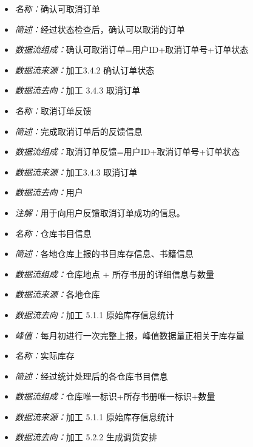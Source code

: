 \vspace{-1mm}

\begin{itemize}
\item \textit{名称：}确认可取消订单
	\item \textit{简述：}经过状态检查后，确认可以取消的订单
	\item \textit{数据流组成：}确认可取消订单=用户ID+取消订单号+订单状态
	\item \textit{数据流来源：}加工3.4.2 确认订单状态
	\item \textit{数据流去向：}加工 3.4.3 取消订单
\end{itemize}

\vspace{-1mm}

\begin{itemize}
\item \textit{名称：}取消订单反馈
	\item \textit{简述：}完成取消订单后的反馈信息
	\item \textit{数据流组成：}取消订单反馈=用户ID+取消订单号+订单状态
	\item \textit{数据流来源：}加工3.4.3 取消订单
	\item \textit{数据流去向：}用户
	\item \textit{注解：}用于向用户反馈取消订单成功的信息。
\end{itemize}

\vspace{-1mm}

\begin{itemize}
\item \textit{名称：}仓库书目信息
	\item \textit{简述：}各地仓库上报的书目库存信息、书籍信息
	\item \textit{数据流组成：}仓库地点 + 所存书册的详细信息与数量
	\item \textit{数据流来源：}各地仓库
	\item \textit{数据流去向：}加工 5.1.1 原始库存信息统计
	\item \textit{峰值：}每月初进行一次完整上报，峰值数据量正相关于库存量
\end{itemize}

\vspace{-1mm}

\begin{itemize}
\item \textit{名称：}实际库存
	\item \textit{简述：}经过统计处理后的各仓库书目信息
	\item \textit{数据流组成：}仓库唯一标识+所存书册唯一标识+数量
	\item \textit{数据流来源：}加工 5.1.1 原始库存信息统计
	\item \textit{数据流去向：}加工 5.2.2 生成调货安排
\end{itemize}

